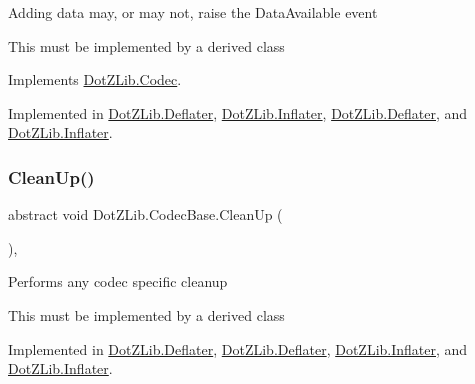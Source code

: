 Adding data may, or may not, raise the {\ttfamily Data\+Available} event

This must be implemented by a derived class

Implements \hyperlink{interface_dot_z_lib_1_1_codec_a137234d0c6fa6981ca8b602340e79dbc}{Dot\+Z\+Lib.\+Codec}.



Implemented in \hyperlink{class_dot_z_lib_1_1_deflater_a2db95e3ca07e562df0652ed1ad8d0c4d}{Dot\+Z\+Lib.\+Deflater}, \hyperlink{class_dot_z_lib_1_1_inflater_a773dd62fe806dd9b6117f859faaeb079}{Dot\+Z\+Lib.\+Inflater}, \hyperlink{class_dot_z_lib_1_1_deflater_a2db95e3ca07e562df0652ed1ad8d0c4d}{Dot\+Z\+Lib.\+Deflater}, and \hyperlink{class_dot_z_lib_1_1_inflater_a773dd62fe806dd9b6117f859faaeb079}{Dot\+Z\+Lib.\+Inflater}.

\mbox{\label{class_dot_z_lib_1_1_codec_base_aa0ded075105c5cf6f5f0d61928c90ca6}} 
\subsubsection{\texorpdfstring{Clean\+Up()}{CleanUp()}\hspace{0.1cm}{\footnotesize\ttfamily [1/2]}}
{\footnotesize\ttfamily abstract void Dot\+Z\+Lib.\+Codec\+Base.\+Clean\+Up (\begin{DoxyParamCaption}{ }\end{DoxyParamCaption})\hspace{0.3cm}{\ttfamily [protected]}, {}}



Performs any codec specific cleanup 

This must be implemented by a derived class

Implemented in \hyperlink{class_dot_z_lib_1_1_deflater_af06ac29d92dbe5d6198b8fa906476e05}{Dot\+Z\+Lib.\+Deflater}, \hyperlink{class_dot_z_lib_1_1_deflater_af06ac29d92dbe5d6198b8fa906476e05}{Dot\+Z\+Lib.\+Deflater}, \hyperlink{class_dot_z_lib_1_1_inflater_af4ed4f530151f83222d2cb732a77626b}{Dot\+Z\+Lib.\+Inflater}, and \hyperlink{class_dot_z_lib_1_1_inflater_af4ed4f530151f83222d2cb732a77626b}{Dot\+Z\+Lib.\+Inflater}.

\mbox{\label{class_dot_z_lib_1_1_codec_base_aa0ded075105c5cf6f5f0d61928c90ca6}} 
